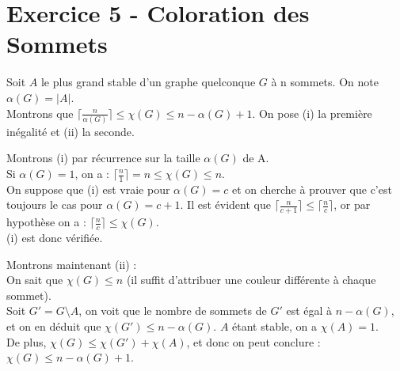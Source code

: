 
\section{Exercice 5 - Coloration des Sommets}\label{ex5}
Soit $A$ le plus grand stable d'un graphe quelconque $G$ \`a n sommets.
On note $\alpha(G) = |A|$. \\
Montrons que $\lceil\frac{n}{\alpha(G)}\rceil \leq \chi(G) \leq n - \alpha(G) + 1$.
On pose (i) la premi\`ere in\'egalit\'e et (ii) la seconde.

Montrons (i) par r\'ecurrence sur la taille $\alpha(G)$ de A.\\
Si $\alpha(G) = 1$, on a : $\lceil\frac{n}{1}\rceil = n \leq \chi(G) \leq n$.\\
On suppose que (i) est vraie pour $\alpha(G) = c$ et on cherche \`a prouver que c'est
toujours le cas pour $\alpha(G) = c+1$.
Il est \'evident que $\lceil\frac{n}{c+1}\rceil \leq \lceil\frac{n}{c}\rceil$,
or par hypoth\`ese on a : $\lceil\frac{n}{c}\rceil \leq \chi(G)$.\\
(i) est donc v\'erifi\'ee.

Montrons maintenant (ii) :\\
On sait que $\chi(G) \leq n$ (il suffit d'attribuer une couleur diff\'erente \`a chaque
sommet).\\
Soit $G' = G \setminus A$, on voit que le nombre de sommets de $G'$ est \'egal \`a $n -
\alpha(G)$, et on en d\'eduit que $\chi(G') \leq n - \alpha(G)$.
$A$ \'etant stable, on a $\chi(A) = 1$.\\
De plus, $\chi(G) \leq \chi(G') + \chi(A)$, et donc on peut conclure :\\
$\chi(G) \leq n - \alpha(G) + 1$.


